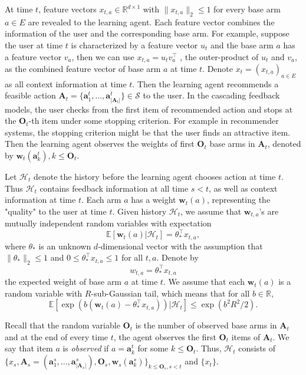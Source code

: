 \documentclass{article}
\newcommand{\EE}{\mathbb{E}}
\newcommand{\RR}{\mathbb{R}}
\newcommand{\bA}{\mathbf{A}}
\newcommand{\ba}{\mathbf{a}}
\newcommand{\bO}{\mathbf{O}}
\newcommand{\bw}{\mathbf{w}}
\newcommand{\cH}{\mathcal{H}}
\newcommand{\cS}{\mathcal{S}}
\newcommand{\abs}[1]{\left| #1 \right|}
\newcommand{\norm}[1]{\| #1 \|}
\begin{document}
At time $t$, feature vectors $x_{t,a} \in \RR^{d \times 1}$ with $\norm{x_{t,a}}_2 \leq 1$ for every base arm $a \in E$ are revealed to the learning agent. Each feature vector combines the information of the user and the corresponding base arm. For example, suppose the user at time $t$ is characterized by a feature vector $u_t$ and the base arm $a$ has a feature vector $v_a$, then we can use $x_{t,a} = u_t v_a^{\top}$ , the outer-product of $u_t$ and $v_a$, as the combined feature vector of base arm $a$ at time $t$. Denote $x_t = (x_{t,a})_{a \in E}$ as all context information at time $t$. Then the learning agent recommends a feasible action $\bA_t=\{ \ba_{1}^t,...,\ba_{\abs{\bA_t}}^t \} \in \cS$ to the user. In the cascading feedback models, the user checks from the first item of recommended action and stops at the $\bO_t$-th item under some stopping criterion. For example in recommender systems, the stopping criterion might be that the user finds an attractive item. Then the learning agent observes the weights of first $\bO_t$ base arms in $\bA_t$, denoted by $\bw_t(\ba_k^t), k \leq \bO_t$. 

Let $\cH_t$ denote the history before the learning agent chooses action at time $t$. Thus $\cH_t$ contains feedback information at all time $s < t$, as well as context information at time $t$. Each arm $a$ has a weight $\bw_t(a)$, representing the "quality" to the user at time $t$. Given history $\cH_t$, we assume that $\bw_{t,a}$'s are mutually independent random variables with expectation
\begin{equation} %
\label{eq:expectation}
\EE[\bw_{t}(a) | \cH_t] = \theta_{\ast}^{\top} x_{t,a},
\end{equation}
where $\theta_{\ast}$ is an unknown $d$-dimensional vector with the assumption that $\norm{\theta_{\ast}}_2 \leq 1$ and $0 \leq \theta_{\ast}^{\top} x_{t,a} \leq 1$ for all $t, a$. Denote by 
$$
w_{t,a} = \theta_{\ast}^{\top} x_{t,a}
$$
the expected weight of base arm $a$ at time $t$. We assume that each $\bw_{t}(a)$ is a random variable with $R$-sub-Gaussian tail, which means that for all $b \in \RR$, 
$$
\EE[\exp(b(\bw_{t}(a) - \theta_{\ast}^{\top} x_{t,a})) | \cH_t] \leq \exp(b^2 R^2 / 2).
$$

Recall that the random variable $\bO_t$ is the number of observed base arms in $\bA_t$ and at the end of every time $t$, the agent observes the first $\bO_t$ items of $\bA_t$. We say that item $a$ is {\it observed} if $a = \ba_k^t$ for some $k \leq \bO_t$. Thus, $\cH_t$ consists of $\{x_s, \bA_s = (\ba_{1}^s,...,\ba_{\abs{\bA_s}}^s), \bO_s, \bw_s(\ba_k^s) \}_{k\leq \bO_s, s < t}$ and $\{x_t\}$.
\end{document}
